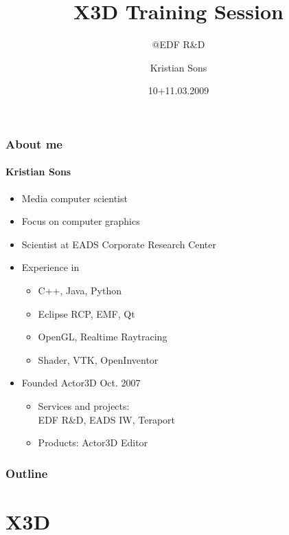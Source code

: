 \documentclass[t]{beamer}
\title{X3D Training Session}
\subtitle{@EDF R\&D}
\author{Kristian Sons}
\date{10+11.03.2009}
\begin{document}
\begin{frame}[t]
\titlepage
\end{frame}





\begin{frame}[t]
\frametitle{About me}
\framesubtitle{Kristian Sons}
\begin{itemize}
	\item Media computer scientist
	\item Focus on computer graphics
	\item Scientist at EADS Corporate Research Center 
	\item Experience in
	\begin{itemize}
	\item C++, Java, Python
	\item Eclipse RCP, EMF, Qt
	\item OpenGL, Realtime Raytracing
	\item Shader, VTK, OpenInventor
	\end{itemize}
	\item Founded Actor3D Oct. 2007
	\begin{itemize}
	\item Services and projects: \\EDF R\&D, EADS IW, Teraport
	\item Products: Actor3D Editor
	\end{itemize}
\end{itemize}


\end{frame}

   \begin{frame}
       \frametitle{Outline}
       \tableofcontents
   \end{frame}


\section{X3D}
\end{document}
